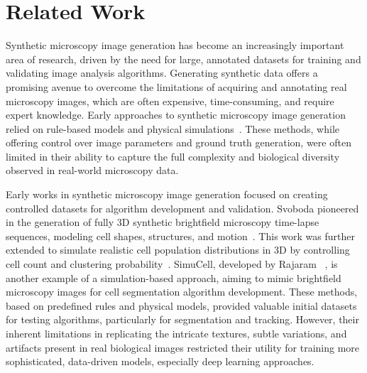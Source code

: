 \section{Related Work}
\label{sec:related-work}
Synthetic microscopy image generation has become an increasingly important area of research, driven by the need for large, annotated datasets for training and validating image analysis algorithms.
Generating synthetic data offers a promising avenue to overcome the limitations of acquiring and annotating real microscopy images, which are often expensive, time-consuming, and require expert knowledge.
Early approaches to synthetic microscopy image generation relied on rule-based models and physical simulations~\cite{david_svoboda_generation_2012,david_svoboda_towards_2013,rajaram_simucell_2012}.
These methods, while offering control over image parameters and ground truth generation, were often limited in their ability to capture the full complexity and biological diversity observed in real-world microscopy data.

Early works in synthetic microscopy image generation focused on creating controlled datasets for algorithm development and validation.
Svoboda \etal pioneered in the generation of fully 3D synthetic brightfield microscopy time-lapse sequences, modeling cell shapes, structures, and motion~\cite{david_svoboda_generation_2012}.
This work was further extended to simulate realistic cell population distributions in 3D by controlling cell count and clustering probability~\cite{david_svoboda_towards_2013}.
SimuCell, developed by Rajaram \etal~\cite{rajaram_simucell_2012}, is another example of a simulation-based approach, aiming to mimic brightfield microscopy images for cell segmentation algorithm development.
These methods, based on predefined rules and physical models, provided valuable initial datasets for testing algorithms, particularly for segmentation and tracking.
However, their inherent limitations in replicating the intricate textures, subtle variations, and artifacts present in real biological images restricted their utility for training more sophisticated, data-driven models, especially deep learning approaches.

